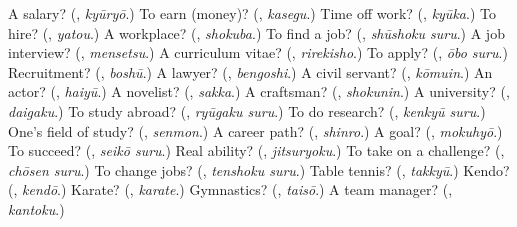\begin{tcolorbox}[breakable,colback=teal!4,colframe=teal!35!black,title={Before you move on}]
A salary? (\textbf{}, \emph{kyūryō}.) To earn (money)? (\textbf{}, \emph{kasegu}.) Time off work? (\textbf{}, \emph{kyūka}.) To hire? (\textbf{}, \emph{yatou}.) A workplace? (\textbf{}, \emph{shokuba}.) To find a job? (\textbf{}, \emph{shūshoku suru}.) A job interview? (\textbf{}, \emph{mensetsu}.) A curriculum vitae? (\textbf{}, \emph{rirekisho}.) To apply? (\textbf{}, \emph{ōbo suru}.) Recruitment? (\textbf{}, \emph{boshū}.) A lawyer? (\textbf{}, \emph{bengoshi}.) A civil servant? (\textbf{}, \emph{kōmuin}.) An actor? (\textbf{}, \emph{haiyū}.) A novelist? (\textbf{}, \emph{sakka}.) A craftsman? (\textbf{}, \emph{shokunin}.) A university? (\textbf{}, \emph{daigaku}.) To study abroad? (\textbf{}, \emph{ryūgaku suru}.) To do research? (\textbf{}, \emph{kenkyū suru}.) One's field of study? (\textbf{}, \emph{senmon}.) A career path? (\textbf{}, \emph{shinro}.) A goal? (\textbf{}, \emph{mokuhyō}.) To succeed? (\textbf{}, \emph{seikō suru}.) Real ability? (\textbf{}, \emph{jitsuryoku}.) To take on a challenge? (\textbf{}, \emph{chōsen suru}.) To change jobs? (\textbf{}, \emph{tenshoku suru}.) Table tennis? (\textbf{}, \emph{takkyū}.) Kendo? (\textbf{}, \emph{kendō}.) Karate? (\textbf{}, \emph{karate}.) Gymnastics? (\textbf{}, \emph{taisō}.) A team manager? (\textbf{}, \emph{kantoku}.)
\end{tcolorbox}
